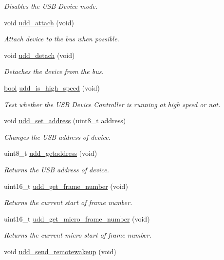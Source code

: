 \begin{DoxyCompactItemize}
\begin{DoxyCompactList}\small\item\em Disables the U\-S\-B Device mode. \end{DoxyCompactList}\item 
void \hyperlink{group__udd__group_ga7a7c0d9236c922c2af33c6702565a99f}{udd\-\_\-attach} (void)
\begin{DoxyCompactList}\small\item\em Attach device to the bus when possible. \end{DoxyCompactList}\item 
void \hyperlink{group__udd__group_ga03e59eaa264f1dbe5a52559311d0520e}{udd\-\_\-detach} (void)
\begin{DoxyCompactList}\small\item\em Detaches the device from the bus. \end{DoxyCompactList}\item 
\hyperlink{group__group__xmega__utils_ga97a80ca1602ebf2303258971a2c938e2}{bool} \hyperlink{group__udd__group_ga85f403ddb78776b1ba014dafd3ffec2c}{udd\-\_\-is\-\_\-high\-\_\-speed} (void)
\begin{DoxyCompactList}\small\item\em Test whether the U\-S\-B Device Controller is running at high speed or not. \end{DoxyCompactList}\item 
void \hyperlink{group__udd__group_ga05da762e0faf9d478e532de40afa71f6}{udd\-\_\-set\-\_\-address} (uint8\-\_\-t address)
\begin{DoxyCompactList}\small\item\em Changes the U\-S\-B address of device. \end{DoxyCompactList}\item 
uint8\-\_\-t \hyperlink{group__udd__group_gaebd36638d482f6df00a8aff006ef2246}{udd\-\_\-getaddress} (void)
\begin{DoxyCompactList}\small\item\em Returns the U\-S\-B address of device. \end{DoxyCompactList}\item 
uint16\-\_\-t \hyperlink{group__udd__group_ga96dc248cc05e07ffe2cf21e4d7465320}{udd\-\_\-get\-\_\-frame\-\_\-number} (void)
\begin{DoxyCompactList}\small\item\em Returns the current start of frame number. \end{DoxyCompactList}\item 
uint16\-\_\-t \hyperlink{group__udd__group_ga63047eec59b8e8798ca1d3366472d82b}{udd\-\_\-get\-\_\-micro\-\_\-frame\-\_\-number} (void)
\begin{DoxyCompactList}\small\item\em Returns the current micro start of frame number. \end{DoxyCompactList}\item 
\hypertarget{group__udd__group_gac447212e04789282dabee65a23fe2a08}{void \hyperlink{group__udd__group_gac447212e04789282dabee65a23fe2a08}{udd\-\_\-send\-\_\-remotewakeup} (void)}\label{group__udd__group_gac447212e04789282dabee65a23fe2a08}


\end{DoxyCompactItemize}
